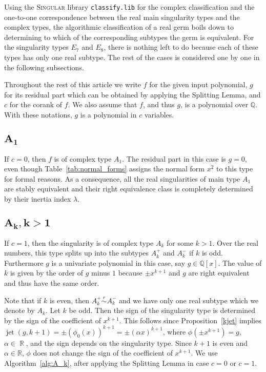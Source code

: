 \documentclass[noend]{amsproc}
\theoremstyle{definition}
\newcommand{\classify}{\texttt{classify.lib}}
\newcommand{\requiv}{\ensuremath{\mathrel{\overset{r}{\sim}}}}
\DeclareMathOperator{\jet}{jet}
\DeclareMathOperator{\R}{\mathbb{R}}
\begin{document}
Using the \textsc{Singular} library \classify{} \citep{classify} for the
complex classification and the one-to-one correspondence between the real main
singularity types and the complex types, the algorithmic classification of a
real germ boils down to determining to which of the corresponding subtypes the
germ is equivalent. For the singularity types $E_7$ and $E_8$, there is nothing
left to do because each of these types has only one real subtype. The rest of
the cases is considered one by one in the following subsections.

Throughout the rest of this article we write $f$ for the given input
polynomial, $g$ for its residual part which can be obtained by applying the
Splitting Lemma, and $c$ for the corank of $f$. We also assume that $f$, and
thus $g$, is a polynomial over $\mathbb Q$. With these notations, $g$ is a
polynomial in $c$ variables.


\subsection{$\boldsymbol{A_1}$}

If $c = 0$, then $f$ is of complex type $A_1$. The residual part in this case
is $g = 0$, even though Table~\ref{tab:normal_forms} assigns the normal form
$x^2$ to this type for formal reasons. As a consequence, all the real
singularities of main type $A_1$ are stably equivalent and their right
equivalence class is completely determined by their inertia index $\lambda$.


\subsection{$\boldsymbol{A_k, k > 1}$}

If $c = 1$, then the singularity is of complex type $A_k$ for some $k > 1$.
Over the real numbers, this type splits up into the subtypes $A_k^+$ and
$A_k^-$ if $k$ is odd. Furthermore $g$ is a univariate polynomial in this case,
say $g\in\mathbb Q[x]$. The value of $k$ is given by the order of $g$ minus
$1$ because $\pm x^{k+1}$ and $g$ are right equivalent and thus have the same
order.

Note that if $k$ is even, then $A_k^+ \requiv A_k^-$ and we have only one real
subtype which we denote by $A_k$. Let $k$ be odd. Then the sign of the
singularity type is determined by the sign of the coefficient of $x^{k+1}$.
This follows since Proposition~\ref{kjet} implies
$\jet(g, k+1) = \pm(\phi_0(x))^{k+1} = \pm(\alpha x)^{k+1}$, where
$\phi(\pm x^{k+1}) = g$, $\alpha \in \R$, and the sign depends on the
singularity type. Since $k+1$ is even and $\alpha \in \mathbb R$, $\phi$ does
not change the sign of the coefficient of $x^{k+1}$. We use
Algorithm~\ref{alg:A_k}, after applying the Splitting Lemma in case $c = 0$ or
$c = 1$.
\end{document}
